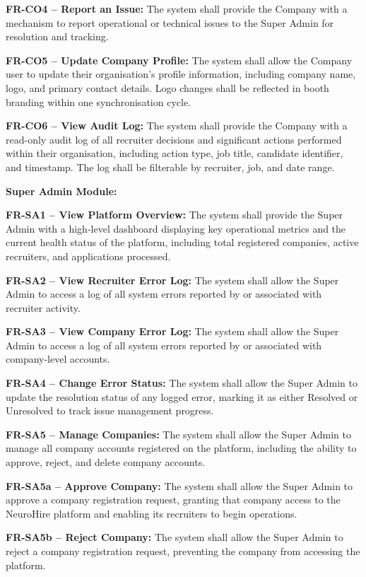 \begin{outline}
  \2 \textbf{FR-CO4 -- Report an Issue:}
  The system shall provide the Company with a mechanism to report operational or technical
  issues to the Super Admin for resolution and tracking.

  \2 \textbf{FR-CO5 -- Update Company Profile:}
  The system shall allow the Company user to update their organisation's profile information,
  including company name, logo, and primary contact details. Logo changes shall be reflected
  in booth branding within one synchronisation cycle.

  \2 \textbf{FR-CO6 -- View Audit Log:}
  The system shall provide the Company with a read-only audit log of all recruiter decisions
  and significant actions performed within their organisation, including action type, job
  title, candidate identifier, and timestamp. The log shall be filterable by recruiter, job,
  and date range.

  \1 \textbf{Super Admin Module:}

  \2 \textbf{FR-SA1 -- View Platform Overview:}
  The system shall provide the Super Admin with a high-level dashboard displaying key
  operational metrics and the current health status of the platform, including total
  registered companies, active recruiters, and applications processed.

  \2 \textbf{FR-SA2 -- View Recruiter Error Log:}
  The system shall allow the Super Admin to access a log of all system errors reported by
  or associated with recruiter activity.

  \2 \textbf{FR-SA3 -- View Company Error Log:}
  The system shall allow the Super Admin to access a log of all system errors reported by
  or associated with company-level accounts.

  \2 \textbf{FR-SA4 -- Change Error Status:}
  The system shall allow the Super Admin to update the resolution status of any logged error,
  marking it as either Resolved or Unresolved to track issue management progress.

  \2 \textbf{FR-SA5 -- Manage Companies:}
  The system shall allow the Super Admin to manage all company accounts registered on the
  platform, including the ability to approve, reject, and delete company accounts.

    \3 \textbf{FR-SA5a -- Approve Company:}
    The system shall allow the Super Admin to approve a company registration request,
    granting that company access to the NeuroHire platform and enabling its recruiters to
    begin operations.

    \3 \textbf{FR-SA5b -- Reject Company:}
    The system shall allow the Super Admin to reject a company registration request,
    preventing the company from accessing the platform.


\end{outline}
